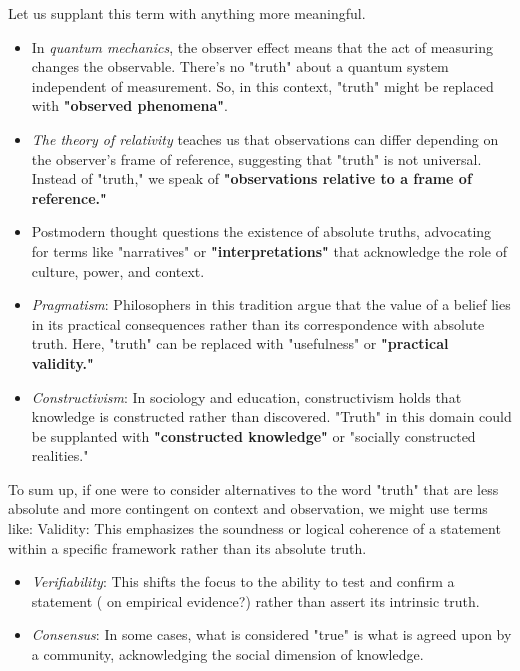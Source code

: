 \documentclass[11pt,a4]{article}
\begin{document}
Let us supplant this term with anything more meaningful.

\begin{itemize}

    \item In \textit{quantum mechanics}, the observer effect means that the act of measuring changes the observable. There's no "truth" about a quantum system independent of measurement. So, in this context, "truth" might be replaced with \textbf{"observed phenomena"}.
    \item \textit{The theory of relativity} teaches us that observations can differ depending on the observer's frame of reference, suggesting that "truth" is not universal. Instead of "truth," we speak of \textbf{"observations relative to a frame of reference."}
    \item Postmodern thought questions the existence of absolute truths, advocating for terms like "narratives" or \textbf{"interpretations"} that acknowledge the role of culture, power, and context.
    \item \textit{Pragmatism}: Philosophers in this tradition argue that the value of a belief lies in its practical consequences rather than its correspondence with absolute truth. Here, "truth" can be replaced with "usefulness" or \textbf{"practical validity."}
    \item \textit{Constructivism}: In sociology and education, constructivism holds that knowledge is constructed rather than discovered. "Truth" in this domain could be supplanted with \textbf{"constructed knowledge"} or "socially constructed realities."
\end{itemize}

To sum up, if one were to consider alternatives to the word "truth" that are less absolute and more contingent on context and observation, we might use terms like:
Validity: This emphasizes the soundness or logical coherence of a statement within a specific framework rather than its absolute truth.

\begin{itemize}

    \item \textit{Verifiability}: This shifts the focus to the ability to test and confirm a statement ( on empirical evidence?) rather than assert its intrinsic truth.
    \item \textit{Consensus}: In some cases, what is considered "true" is what is agreed upon by a community, acknowledging the social dimension of knowledge.

\end{itemize}
\end{document}
